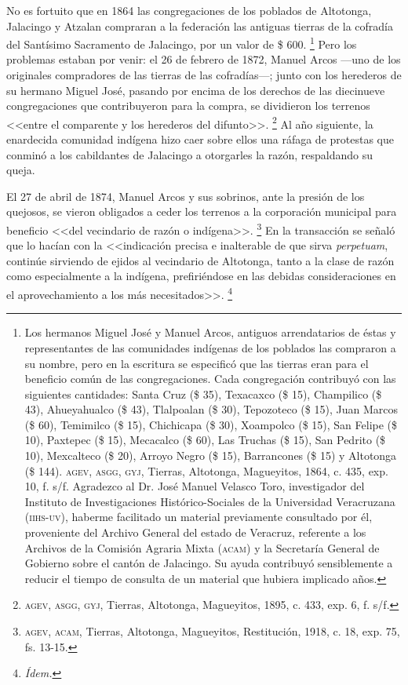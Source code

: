 \documentclass[14pt,twoside,final]{extbook} %
\let\oldfootnote\footnote
\renewcommand\footnote[1]{%
\oldfootnote{\hspace{1mm}#1}}
\begin{document}
No es fortuito que en 1864 las congregaciones de los poblados de Altotonga, Jalacingo y Atzalan compraran a la federación las antiguas tierras de la cofradía del Santísimo Sacramento de Jalacingo, por un valor de \$ 600.\footnote{Los hermanos Miguel José y Manuel Arcos, antiguos arrendatarios de éstas y representantes de las comunidades indígenas de los poblados las compraron a su nombre, pero en la escritura se especificó que las tierras eran para el beneficio común de las congregaciones. Cada congregación contribuyó con las siguientes cantidades: Santa Cruz (\$ 35), Texacaxco (\$ 15), Champilico (\$ 43), Ahueyahualco (\$ 43), Tlalpoalan (\$ 30), Tepozoteco (\$ 15), Juan Marcos (\$ 60), Temimilco (\$ 15), Chichicapa (\$ 30), Xoampolco (\$ 15), San Felipe (\$ 10), Paxtepec (\$ 15), Mecacalco (\$ 60), Las Truchas (\$ 15), San Pedrito (\$ 10), Mexcalteco (\$ 20), Arroyo Negro (\$ 15), Barrancones (\$ 15) y Altotonga (\$ 144). \textsc{agev}, \textsc{asgg}, \textsc{gyj}, Tierras, Altotonga, Magueyitos, 1864, c. 435, exp. 10, f. s/f. Agradezco al Dr. José Manuel Velasco Toro, investigador del Instituto de Investigaciones Histórico-Sociales de la Universidad Veracruzana (\textsc{iihs-uv}), haberme facilitado un material previamente consultado por él, proveniente del Archivo General del estado de Veracruz, referente a los Archivos de la Comisión Agraria Mixta (\textsc{acam}) y la Secretaría General de Gobierno sobre el cantón de Jalacingo. Su ayuda contribuyó sensiblemente a reducir el tiempo de consulta de un material que hubiera implicado años.} Pero los problemas estaban por venir: el 26 de febrero de 1872, Manuel Arcos ---uno de los originales compradores de las tierras de las cofradías---; junto con los herederos de su hermano Miguel José, pasando por encima de los derechos de las diecinueve congregaciones que contribuyeron para la compra, se dividieron los terrenos <<entre el comparente y los herederos del difunto>>.\footnote{\textsc{agev, asgg, gyj}, Tierras, Altotonga, Magueyitos, 1895, c. 433, exp. 6, f. s/f.} Al año siguiente, la enardecida comunidad indígena hizo caer sobre ellos una ráfaga de protestas que conminó a los cabildantes de Jalacingo a otorgarles la razón, respaldando su queja.

El 27 de abril de 1874, Manuel Arcos y sus sobrinos, ante la presión de los quejosos, se vieron obligados a ceder los terrenos a la corporación municipal para beneficio <<del vecindario de razón o indígena>>.\footnote{\textsc{agev, acam}, Tierras, Altotonga, Magueyitos, Restitución, 1918, c. 18, exp. 75, fs. 13-15.} En la transacción se señaló que lo hacían con la <<indicación precisa e inalterable de que sirva \emph{perpetuam}, continúe sirviendo de ejidos al vecindario de Altotonga, tanto a la clase de razón como especialmente a la indígena, prefiriéndose en las debidas consideraciones en el aprovechamiento a los más necesitados>>.\footnote{\em Ídem.}
\end{document}
